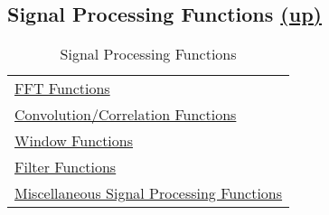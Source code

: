 \subsection*{Signal Processing Functions \hspace*{\fill}\hyperlink{VSIPspecHead}{(up)}\hypertarget{SignalProcessing}{}}
\begin{table}[H]
\hypertarget{vsiplSignalProcessing}{}
\caption{Signal Processing Functions}
\label{tab:SignalProcessing}
\begin{center}
\begin{tabular}{|l|}\hline
\hyperlink{fftFunctions}{FFT Functions}\\
\hyperlink{convCorrFunctions}{Convolution/Correlation Functions}\\
\hyperlink{windowFunctions}{Window Functions}\\
\hyperlink{filterFunctions}{Filter Functions}\\
\hyperlink{miscSigProcFunctions}{Miscellaneous Signal Processing Functions}\\
\hline\end{tabular}
\end{center}
\end{table}%
      
      
      
      
      